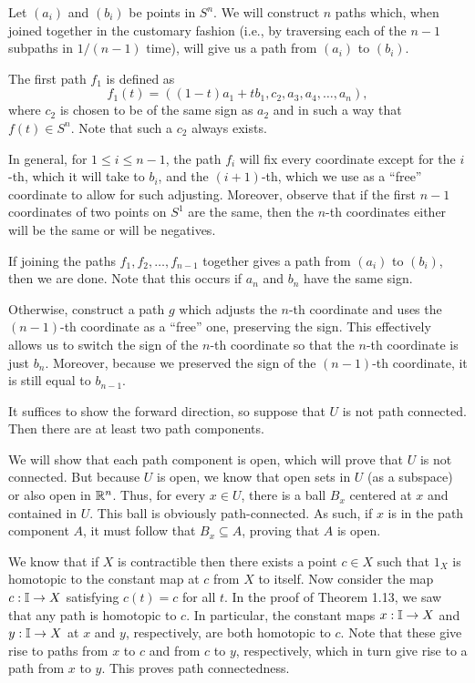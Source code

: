 \documentclass[../../solutions.tex]{subfiles}
\begin{document}
\begin{exercise} \leavevmode
Let $(a_i)$ and $(b_i)$ be points in $S^n$. We will construct $n$ paths which, when joined together in the customary fashion (i.e., by traversing each of the $n-1$ subpaths in $1/(n-1)$ time), will give us a path from $(a_i)$ to $(b_i)$. 

The first path $f_1$ is defined as \[f_1(t)=((1-t)a_1+tb_1,c_2,a_3,a_4,\dots,a_n),\] where $c_2$ is chosen to be of the same sign as $a_2$ and in such a way that $f(t)\in S^n$. Note that such a $c_2$ always exists. 

In general, for $1\le i\le n-1$, the path $f_i$ will fix every coordinate except for the $i$-th, which it will take to $b_i$, and the $(i+1)$-th, which we use as a ``free'' coordinate to allow for such adjusting. Moreover, observe that if the first $n-1$ coordinates of two points on $S^1$ are the same, then the $n$-th coordinates either will be the same or will be negatives. 

If joining the paths $f_1,f_2,\dots,f_{n-1}$ together gives a path from $(a_i)$ to $(b_i)$, then we are done. Note that this occurs if $a_n$ and $b_n$ have the same sign. 

Otherwise, construct a path $g$ which adjusts the $n$-th coordinate and uses the $(n-1)$-th coordinate as a ``free'' one, preserving the sign. This effectively allows us to switch the sign of the $n$-th coordinate so that the $n$-th coordinate is just $b_n$. Moreover, because we preserved the sign of the $(n-1)$-th coordinate, it is still equal to $b_{n-1}$. 
\end{exercise} 

\begin{exercise} \leavevmode
It suffices to show the forward direction, so suppose that $U$ is not path connected. Then there are at least two path components. 

We will show that each path component is open, which will prove that $U$ is not connected. But because $U$ is open, we know that open sets in $U$ (as a subspace) or also open in $\mathbb{R}^n$. Thus, for every $x\in U$, there is a ball $B_x$ centered at $x$ and contained in $U$. This ball is obviously path-connected. As such, if $x$ is in the path component $A$, it must follow that $B_x\subseteq A$, proving that $A$ is open. 
\end{exercise} 

\begin{exercise} \leavevmode
We know that if $X$ is contractible then there exists a point $c\in X$ such that $1_X$ is homotopic to the constant map at $c$ from $X$ to itself. Now consider the map $c:\mathbb I\to X$ satisfying $c(t)=c$ for all $t$. In the proof of Theorem 1.13, we saw that any path is homotopic to $c$. In particular, the constant maps $x:\mathbb I\to X$ and $y:\mathbb I\to X$ at $x$ and $y$, respectively, are both homotopic to $c$. Note that these give rise to paths from $x$ to $c$ and from $c$ to $y$, respectively, which in turn give rise to a path from $x$ to $y$. This proves path connectedness. 
\end{exercise} 
\end{document}
